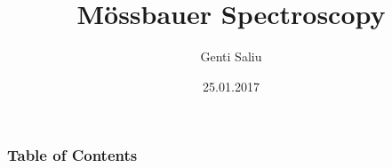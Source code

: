 \documentclass{beamer}
\begin{document}
	
\setlength{\abovedisplayskip}{2pt}
\setlength{\belowdisplayskip}{2pt}

\title{Mössbauer Spectroscopy}   
\author{Genti Saliu} 
\date{25.01.2017}
\setcounter{tocdepth}{2}

\begin{frame}[plain]
\titlepage
\end{frame}

\begin{frame}[plain]
\frametitle{Table of Contents}\tableofcontents
\end{frame}




\end{document}
